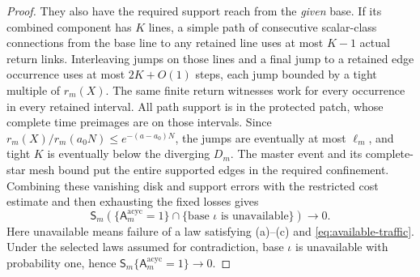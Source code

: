 \begin{proof}
They also have the required support reach from the \emph{given}
base.  If its combined component has \(K\) lines, a simple path
of consecutive scalar-class connections from the base line to
any retained line uses at most \(K-1\) actual return links.
Interleaving jumps on those lines and a final jump to a retained
edge occurrence uses at most \(2K+O(1)\) steps, each jump bounded
by a tight multiple of \(r_m(X)\).  The same finite return
witnesses work for every occurrence in every retained interval.
All path support is in the protected patch, whose complete time
preimages are on those intervals.  Since
\(r_m(X)/r_m(a_0N)\le e^{-(a-a_0)N}\), the jumps are eventually
at most \(\ell_m\), and tight \(K\) is eventually below the
diverging \(D_m\).  The master event and its complete-star mesh
bound put the entire supported edges in the required confinement.
Combining these vanishing disk and support errors with the restricted
cost estimate and then exhausting the fixed losses gives
\[
 \mathsf S_m\!\left(
 \{\mathsf A_m^{\mathrm{acyc}}=1\}\cap
 \{\text{base }\iota\text{ is unavailable}\}
 \right)\longrightarrow0.
\]
Here unavailable means failure of a law satisfying (a)--(c) and
\eqref{eq:available-traffic}.  Under the selected laws assumed for
contradiction, base \(\iota\) is unavailable with probability one, hence
\(\mathsf S_m\{\mathsf A_m^{\mathrm{acyc}}=1\}\to0\).


\end{proof}
